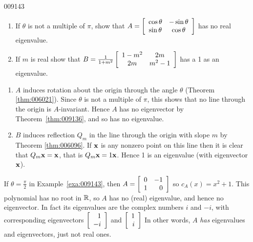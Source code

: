\begin{example}{}{009143}
\begin{enumerate}
\item If $\theta$ is not a multiple of $\pi$, show that $A = \left[ \begin{array}{cc}
\cos \theta & - \sin \theta \\
\sin \theta & \cos \theta
\end{array}\right]$
 has no real eigenvalue.

\item If $m$ is real show that $B = \tfrac{1}{1+m^2} \left[ \begin{array}{cc}
1-m^2 & 2m \\
2m & m^2 -1
\end{array}\right]$
 has a 1 as an eigenvalue.

\end{enumerate}

\begin{solution}
\begin{enumerate}
\item $A$ induces rotation about the origin through the angle $\theta$ (Theorem \ref{thm:006021}). Since $\theta$ is not a multiple of $\pi$, this shows that no line through the origin is $A$-invariant. Hence $A$ has no eigenvector by Theorem~\ref{thm:009136}, and so has no eigenvalue.

\item $B$ induces reflection $Q_{m}$ in the line through the origin with slope $m$ by Theorem \ref{thm:006096}. If $\textbf{x}$ is any nonzero point on this line then it is clear that $Q_{m}\textbf{x} = \textbf{x}$, that is $Q_{m}\textbf{x} = 1\textbf{x}$. Hence 1 is an eigenvalue (with eigenvector $\textbf{x}$).

\end{enumerate}
\end{solution}
\end{example}

If $\theta = \frac{\pi}{2}$ in Example~\ref{exa:009143}, then $A = \left[ \begin{array}{rr}
0 & -1 \\
1 & 0 
\end{array}\right]$
 so $c_{A}(x) = x^{2} + 1$. This polynomial has no root in $\mathbb{R}$, so $A$ has no (real) eigenvalue, and hence no eigenvector. In fact its eigenvalues are the complex numbers $i$ and $-i$, with corresponding eigenvectors $\left[ \begin{array}{r}
1 \\
-i 
\end{array}\right]$
 and $\left[ \begin{array}{r}
1 \\
i 
\end{array}\right]$
 In other words, $A$ \textit{has} eigenvalues and eigenvectors, just not real ones.


